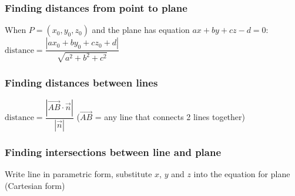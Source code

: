 \subsubsection{Finding distances from point to plane}
When $P=(x_0,y_0,z_0)$ and the plane has equation $ax+by+cz-d=0$:
\begin{math}\text{distance}=\dfrac{|ax_0+by_0+cz_0+d|}{\sqrt{a^2+b^2+c^2}}\end{math}
\subsubsection{Finding distances between lines}
$\text{distance}=\dfrac{|\overrightarrow{AB}\cdot\vec{n}|}{|\vec{n}|}$ ($\overrightarrow{AB}$ = any line that connects 2 lines together)
\subsubsection{Finding intersections between line and plane}
Write line in parametric form, substitute $x$, $y$ and $z$ into the equation for plane (Cartesian form)